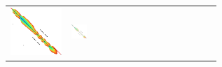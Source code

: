 \begin{figure}[H]
\begin{tabular}{l>{\centering}m{0.12\linewidth}>{\centering}m{0.12\linewidth}>{\centering}m{0.12\linewidth}>{\centering\arraybackslash}m{0.35\linewidth}}
    \includegraphics[scale=0.09]{imgs/comparison/sh.png} &
    \includegraphics[scale=0.09]{imgs/comparison/sh-noprune-dt.png} &

\end{tabular}
\end{figure}

